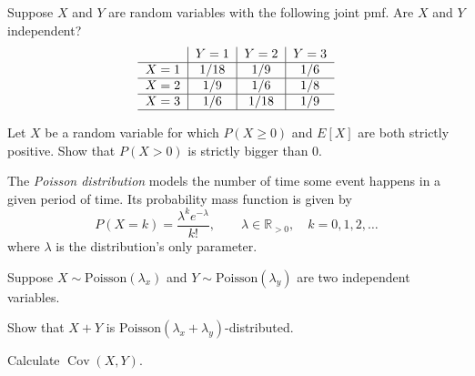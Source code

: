 \documentclass[a4paper,10pt,landscape,twocolumn]{scrartcl}
\DeclareMathOperator{\Cov}{Cov}
\begin{document}

\begin{exercise}[]
  Suppose $X$ and $Y$ are random variables with the following joint pmf. Are
  $X$ and $Y$ independent?
  \[
	\begin{tabular}{c|c|c|c}
			&$Y=1$	&$Y=2$	&$Y=3$\\\hline
	$X=1$	&$1/18$	&$1/9$	&$1/6$ \\\hline
	$X=2$	&$1/9$	&$1/6$	&$1/8$ \\\hline
	$X=3$	&$1/6$	&$1/18$	&$1/9$  \\\hline
	\end{tabular}
  \]
\end{exercise}


\begin{exercise}[]
  Let $X$ be a random variable for which $P(X\ge 0)$ and $E[X]$ are both
  strictly positive. Show that $P(X>0)$ is strictly bigger than $0$.
\end{exercise}

\begin{exercise}[]
  The \emph{Poisson distribution} models the number of time some event happens 
  in a given period of time. Its probability mass function is given by
  \[
    P(X = k) = {\frac {\lambda ^{k}e^{-\lambda }}{k!}}, 
      \qquad \lambda \in \mathbb{R}_{>0}, \quad k=0,1,2,\dots
  \]
  where $\lambda$ is the distribution's only parameter.

  Suppose $X \sim \text{Poisson}(\lambda_x)$ and 
  $Y \sim \text{Poisson}(\lambda_y)$ are two independent variables.
  
  \begin{subex}
    Show that $X+Y$ is $\text{Poisson}(\lambda_x + \lambda_y)$-distributed.
  \end{subex}
  
  \begin{subex}
    Calculate $\Cov(X, Y)$.
  \end{subex}
\end{exercise}

\vfill\creditspracticequestions
\end{document}
